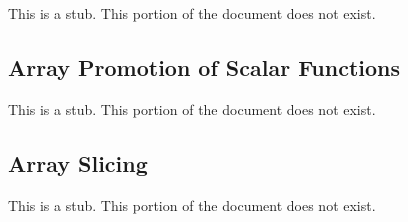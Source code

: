 This is a stub.  This portion of the document does not exist.

\subsection{Array Promotion of Scalar Functions}
\label{Array_Promotion_of_Scalar_Functions}

This is a stub.  This portion of the document does not exist.

\subsection{Array Slicing}
\label{Array_Slicing}

This is a stub.  This portion of the document does not exist.
